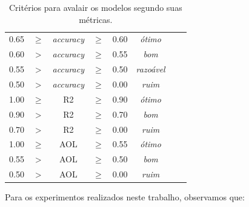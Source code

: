 \begin{table}[H]
\footnotesize
\centering
\caption{Critérios para avalair os modelos segundo suas métricas.}
\begin{tabular}{ccccc|cll}
\cline{1-6}
0.65 & $\geq$ & \textit{accuracy} & $\geq$ & 0.60 & \textit{ótimo} &  &  \\
0.60 & > & \textit{accuracy} & $\geq$ & 0.55 & \textit{bom} &  &  \\
0.55 & > & \textit{accuracy} & $\geq$ & 0.50 & \textit{razoável} &  &  \\
0.50 & > & \textit{accuracy} & $\geq$ & 0.00 & \textit{ruim} &  &  \\
1.00 & $\geq$ & R2 & $\geq$ & 0.90 & \textit{ótimo} &  &  \\
0.90 & > & R2 & $\geq$ & 0.70 & \textit{bom} &  &  \\
0.70 & > & R2 & $\geq$ & 0.00 & \textit{ruim} &  &  \\
1.00 & $\geq$ & AOL & $\geq$ & 0.55 & \textit{ótimo} &  &  \\
0.55 & > & AOL & $\geq$ & 0.50 & \textit{bom} &  &  \\
0.50 & > & AOL & $\geq$ & 0.00 & \textit{ruim} &  &  \\ \cline{1-6}
\end{tabular}
\end{table}


\par
Para os experimentos realizados neste trabalho, observamos que:

